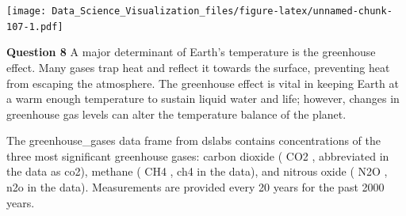 \documentclass[
]{article}
\newenvironment{Shaded}{\begin{snugshade}}{\end{snugshade}}
\newcommand{\DataTypeTok}[1]{\textcolor[rgb]{0.13,0.29,0.53}{#1}}
\newcommand{\DecValTok}[1]{\textcolor[rgb]{0.00,0.00,0.81}{#1}}
\newcommand{\FloatTok}[1]{\textcolor[rgb]{0.00,0.00,0.81}{#1}}
\newcommand{\KeywordTok}[1]{\textcolor[rgb]{0.13,0.29,0.53}{\textbf{#1}}}
\newcommand{\NormalTok}[1]{#1}
\newcommand{\OperatorTok}[1]{\textcolor[rgb]{0.81,0.36,0.00}{\textbf{#1}}}
\newcommand{\StringTok}[1]{\textcolor[rgb]{0.31,0.60,0.02}{#1}}
\begin{document}
\begin{Shaded}
\end{Shaded}

\texttt{[image: Data\_Science\_Visualization\_files/figure-latex/unnamed-chunk-107-1.pdf]}

\textbf{Question 8} A major determinant of Earth's temperature is the
greenhouse effect. Many gases trap heat and reflect it towards the
surface, preventing heat from escaping the atmosphere. The greenhouse
effect is vital in keeping Earth at a warm enough temperature to sustain
liquid water and life; however, changes in greenhouse gas levels can
alter the temperature balance of the planet.

The greenhouse\_gases data frame from dslabs contains concentrations of
the three most significant greenhouse gases: carbon dioxide ( CO2 ,
abbreviated in the data as co2), methane ( CH4 , ch4 in the data), and
nitrous oxide ( N2O , n2o in the data). Measurements are provided every
20 years for the past 2000 years.
\end{document}
